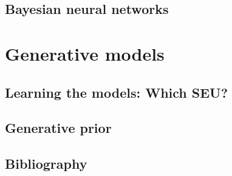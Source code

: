 \documentclass[11pt,fleqn]{book} %
\begin{document}
    \chapter{Bayesian neural networks}
    

\part{Generative models}
    \chapter{Learning the models: Which SEU?}
    
    \chapter{Generative prior}
    
\chapter*{Bibliography}

\printbibliography[heading=bibempty]

\cleardoublepage %
\setlength{\columnsep}{0.75cm} %
\printindex %
\end{document}
